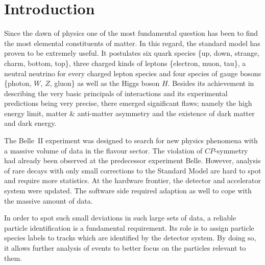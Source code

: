 \chapter{Introduction}
\label{chap:introduction}

Since the dawn of physics one of the most fundamental question has been to find the most elemental constituents of matter. In this regard, the standard model has proven to be extremely useful. It postulates six quark species \{up, down, strange, charm, bottom, top\}, three charged kinds of leptons \{electron, muon, tau\}, a neutral neutrino for every charged lepton species and four species of gauge bosons \{photon, $W$, $Z$, gluon\} as well as the Higgs boson $H$. Besides its achievement in describing the very basic principals of interactions and its experimental predictions being very precise, there emerged significant flaws; namely the high energy limit, matter \& anti-matter asymmetry and the existence of dark matter and dark energy.

The Belle~\RN{2} experiment was designed to search for new physics phenomena with a massive volume of data in the flavour sector. The violation of $CP$-symmetry had already been observed at the predecessor experiment Belle. However, analysis of rare decays with only small corrections to the Standard Model are hard to spot and require more statistics. At the hardware frontier, the detector and accelerator system were updated. The software side required adaption as well to cope with the massive amount of data.

In order to spot such small deviations in such large sets of data, a reliable particle identification is a fundamental requirement. Its role is to assign particle species labels to tracks which are identified by the detector system. By doing so, it allows further analysis of events to better focus on the particles relevant to them.

